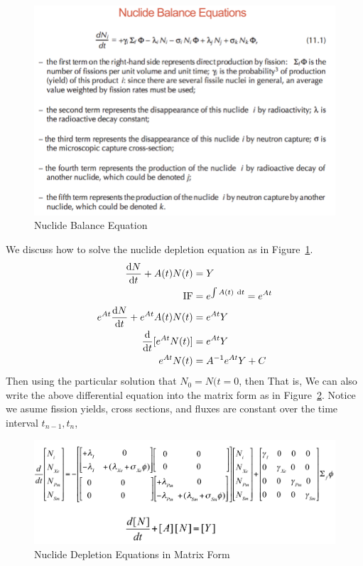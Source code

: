 \documentclass{school-22.211-notes}
\begin{document}
\clearpage
{}
\begin{figure}[ht]
  \centering
  \includegraphics[width=5in]{images/dfs/nuclide-balance-equation.png}
  \caption{Nuclide Balance Equation} \label{nbe} 
\end{figure}
We discuss how to solve the nuclide depletion equation as in Figure~\ref{nbe}. 
\begin{align}
\frac{\mathrm{d}N}{\mathrm{d}t} + A(t) N(t) &= Y \\
\mbox{IF} &= e^{\int A(t) \mbox{ }\mathrm{d} t} = e^{At} \\
e^{At} \frac{\mathrm{d}N}{\mathrm{d}t} + e^{At} A(t) N(t) &= e^{At} Y \\
\frac{\mathrm{d}}{\mathrm{d}t}[e^{At} N(t) ] &= e^{At} Y \\
e^{At} N(t) &= A^{-1} e^{At} Y + C 
\end{align}
Then using the particular solution that $N_0 = N(t=0$, then 
That is, 
We can also write the above differential equation into the matrix form as in Figure~\ref{depletion-matrix}. Notice we asume fission yields, cross sections, and fluxes are constant over the time interval $t_{n-1}, t_n$,
\begin{figure}[ht]
  \centering
  \includegraphics[width=5in]{images/dfs/depletion-matrix-form.png}
  \caption{Nuclide Depletion Equations in Matrix Form} \label{depletion-matrix} 
\end{figure}
\end{document}
